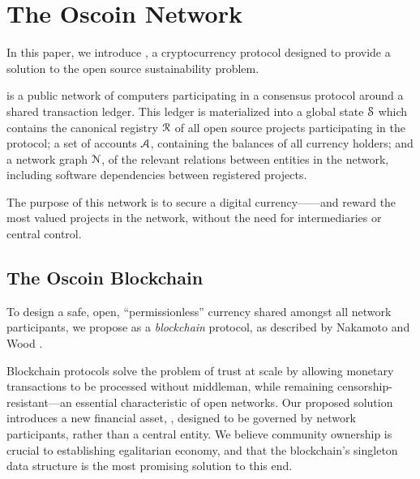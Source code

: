 \section{The Oscoin Network}
\label{s:oscoin}

\noindent In this paper, we introduce \oscoin{}, a cryptocurrency protocol
designed to provide a solution to the open source sustainability problem.

\Oscoin{} is a public network of computers participating in a consensus
protocol around a shared transaction ledger.
This ledger is materialized into a global state $\mathcal{S}$ which
contains the canonical registry $\mathcal{R}$ of all open source
projects participating in the protocol; a set of accounts
$\mathcal{A}$, containing the balances of all currency holders; and
a network graph $\mathcal{N}$, of the relevant relations between
entities in the network, including software dependencies between registered projects.

The purpose of this network is to secure a digital currency---\oscoin{}---and
reward the most valued projects in the network, without the need
for intermediaries or central control.

\subsection{The Oscoin Blockchain}

To design a safe, open, ``permissionless'' currency shared amongst all network
participants, we propose \oscoin{} as a \emph{blockchain} protocol, as
described by Nakamoto \cite{bitcoin} and Wood \cite{ethereum}.

Blockchain protocols solve the problem of trust at scale by allowing monetary
transactions to be processed without middleman, while remaining
censorship-resistant---an essential characteristic of open networks. Our
proposed solution introduces a new financial asset, \oscoin{}, designed to be
governed by network participants, rather than a central entity. We believe community
ownership is crucial to establishing egalitarian economy, and that the
blockchain's singleton data structure is the most promising solution to this end.

